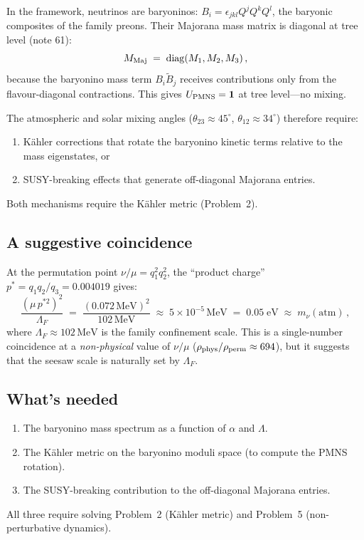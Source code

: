 \documentclass[12pt,a4paper]{article}
\newcommand{\diag}{\mathrm{diag}}
\newcommand{\MeV}{\,\mathrm{MeV}}
\begin{document}
In the framework, neutrinos are baryoninos: $B_i = \epsilon_{jkl} Q^j Q^k Q^l$,
the baryonic composites of the family preons.  Their Majorana mass matrix
is diagonal at tree level (note 61):
\begin{equation}
  M_{\rm Maj} \;=\; \diag(M_1, M_2, M_3)\,,
\end{equation}
because the baryonino mass term $B_i \tilde{B}_j$ receives contributions
only from the flavour-diagonal contractions.  This gives
$U_{\rm PMNS} = \mathbf{1}$ at tree level---no mixing.

The atmospheric and solar mixing angles ($\theta_{23} \approx 45^\circ$,
$\theta_{12} \approx 34^\circ$) therefore require:
\begin{enumerate}
\item K\"ahler corrections that rotate the baryonino kinetic terms
  relative to the mass eigenstates, or
\item SUSY-breaking effects that generate off-diagonal Majorana entries.
\end{enumerate}
Both mechanisms require the K\"ahler metric (Problem~2).

\subsection{A suggestive coincidence}

At the permutation point $\nu/\mu = q_1^2 q_2^2$, the ``product charge''
$p^* = q_1 q_2/q_3 = 0.004019$ gives:
\begin{equation}
  \frac{(\mu\,p^{*2})^2}{\Lambda_F}
  \;=\; \frac{(0.072\MeV)^2}{102\MeV}
  \;\approx\; 5 \times 10^{-5}\MeV
  \;=\; 0.05\;\mathrm{eV}
  \;\approx\; m_\nu(\mathrm{atm})\,,
\end{equation}
where $\Lambda_F \approx 102\MeV$ is the family confinement scale.
This is a single-number coincidence at a \emph{non-physical}
value of $\nu/\mu$ ($\rho_{\rm phys}/\rho_{\rm perm} \approx 694$),
but it suggests that the seesaw scale is naturally set by $\Lambda_F$.

\subsection{What's needed}

\begin{enumerate}
\item The baryonino mass spectrum as a function of $\alpha$ and $\Lambda$.
\item The K\"ahler metric on the baryonino moduli space (to compute
  the PMNS rotation).
\item The SUSY-breaking contribution to the off-diagonal Majorana entries.
\end{enumerate}
All three require solving Problem~2 (K\"ahler metric) and Problem~5
(non-perturbative dynamics).
\end{document}
